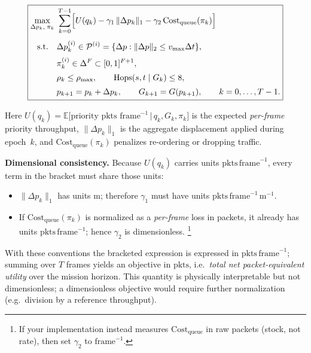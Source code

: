 \documentclass[doc.tex]{subfiles}
\begin{document}
\vspace*{-1.5ex}
\begin{equation}
\label{eq:nettop_opt}
\boxed{
\begin{aligned}
\max_{\Delta p_k,\;\pi_k}\;
&\sum_{k=0}^{T-1}
  \Bigl[
      U(q_k)
      -\gamma_1\,\|\Delta p_k\|_1
      -\gamma_2\,\mathrm{Cost}_{\text{queue}}(\pi_k)
  \Bigr] \\[4pt]
\text{s.t.}\quad
&\Delta p_k^{(i)} \in \mathcal{P}^{(i)}
  =\{\Delta p:\|\Delta p\|_2\le v_{\max}\Delta t\},                       \\[2pt]
&\pi_k^{(i)}      \in \Delta^{F}\subset[0,1]^{F+1},                       \\[2pt]
&\rho_k\le\rho_{\max},\qquad
  \mathrm{Hops}(s,t\mid G_k)\le 8,                                        \\[2pt]
&p_{k+1}=p_k+\Delta p_k,\qquad
  G_{k+1}=G(p_{k+1}),\qquad
  k=0,\dots,T-1.
\end{aligned}}
\end{equation}

Here \(U(q_k)=\mathbb{E}\bigl[\text{priority pkts frame}^{-1}\,|\,q_k,G_k,\pi_k\bigr]\)
is the expected \emph{per-frame} priority throughput,  
\(\|\Delta p_k\|_1\) is the aggregate displacement applied during epoch~\(k\),
and \(\mathrm{Cost}_{\text{queue}}(\pi_k)\) penalizes re-ordering or dropping traffic.

\medskip
\noindent\textbf{Dimensional consistency.}  
Because \(U(q_k)\) carries units \(\text{pkts}\,\text{frame}^{-1}\),
every term in the bracket must share those units:

\begin{itemize}
\setlength\itemsep{2pt}
  \item \(\|\Delta p_k\|_1\) has units \(\text{m}\);
        therefore \(\gamma_1\) must have units
        \(\text{pkts}\,\text{frame}^{-1}\,\text{m}^{-1}\).
  \item If \(\mathrm{Cost}_{\text{queue}}(\pi_k)\) is normalized
        as a \emph{per-frame} loss in packets,
        it already has units \(\text{pkts}\,\text{frame}^{-1}\);
        hence \(\gamma_2\) is dimensionless.%
        \footnote{If your implementation instead measures
                 \(\mathrm{Cost}_{\text{queue}}\) in raw packets
                 (stock, not rate), then set
                 \(\gamma_2\) to \(\text{frame}^{-1}\).}
\end{itemize}

With these conventions the bracketed expression is expressed in
\(\text{pkts}\,\text{frame}^{-1}\); summing over \(T\) frames yields an
objective in \(\text{pkts}\), i.e.\ \emph{total net packet-equivalent
utility} over the mission horizon.  This quantity is physically
interpretable but not dimensionless; a dimensionless objective would
require further normalization (e.g.\ division by a reference throughput).
\end{document}
